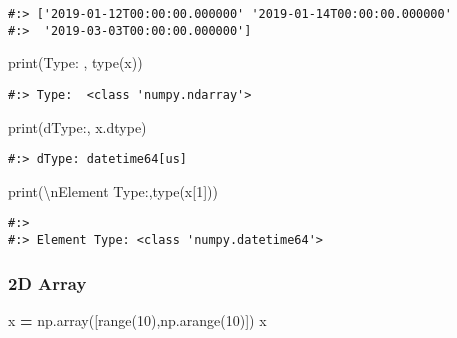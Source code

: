 \documentclass[
]{book}
\newenvironment{Shaded}{\begin{snugshade}}{\end{snugshade}}
\newcommand{\BuiltInTok}[1]{#1}
\newcommand{\CharTok}[1]{\textcolor[rgb]{0.5,0.5,0.5}{#1}}
\newcommand{\DecValTok}[1]{\textcolor[rgb]{0.06,0.06,0.06}{#1}}
\newcommand{\NormalTok}[1]{#1}
\newcommand{\OperatorTok}[1]{\textcolor[rgb]{0.43,0.43,0.43}{\textbf{#1}}}
\newcommand{\StringTok}[1]{\textcolor[rgb]{0.5,0.5,0.5}{#1}}
\begin{document}
\begin{verbatim}
#:> ['2019-01-12T00:00:00.000000' '2019-01-14T00:00:00.000000'
#:>  '2019-03-03T00:00:00.000000']
\end{verbatim}

\begin{Shaded}
\begin{Highlighting}[]
\BuiltInTok{print}\NormalTok{(}\StringTok{\textquotesingle{}Type: \textquotesingle{}}\NormalTok{, }\BuiltInTok{type}\NormalTok{(x))}
\end{Highlighting}
\end{Shaded}

\begin{verbatim}
#:> Type:  <class 'numpy.ndarray'>
\end{verbatim}

\begin{Shaded}
\begin{Highlighting}[]
\BuiltInTok{print}\NormalTok{(}\StringTok{\textquotesingle{}dType:\textquotesingle{}}\NormalTok{, x.dtype)}
\end{Highlighting}
\end{Shaded}

\begin{verbatim}
#:> dType: datetime64[us]
\end{verbatim}

\begin{Shaded}
\begin{Highlighting}[]
\BuiltInTok{print}\NormalTok{(}\StringTok{\textquotesingle{}}\CharTok{\textbackslash{}n}\StringTok{Element Type:\textquotesingle{}}\NormalTok{,}\BuiltInTok{type}\NormalTok{(x[}\DecValTok{1}\NormalTok{]))}
\end{Highlighting}
\end{Shaded}

\begin{verbatim}
#:> 
#:> Element Type: <class 'numpy.datetime64'>
\end{verbatim}

\hypertarget{d-array}{%
\subsubsection{2D Array}\label{d-array}}

\begin{Shaded}
\begin{Highlighting}[]
\NormalTok{x }\OperatorTok{=}\NormalTok{ np.array([}\BuiltInTok{range}\NormalTok{(}\DecValTok{10}\NormalTok{),np.arange(}\DecValTok{10}\NormalTok{)])}
\NormalTok{x}
\end{Highlighting}
\end{Shaded}
\end{document}

